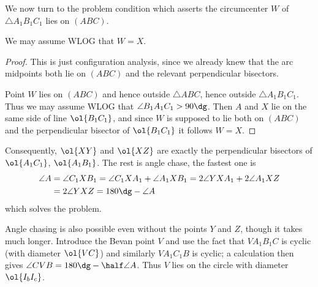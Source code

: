 We now turn to the problem condition
which asserts the circumcenter $W$ of $\triangle A_1B_1C_1$
lies on $(ABC)$.
\begin{claim*}
  We may assume WLOG that $W = X$.
\end{claim*}
\begin{proof}
  This is just configuration analysis,
  since we already knew that the arc midpoints
  both lie on $(ABC)$ and the relevant perpendicular bisectors.

  Point $W$ lies on $(ABC)$ and hence outside $\triangle ABC$,
  hence outside $\triangle A_1 B_1 C_1$.
  Thus we may assume WLOG that $\angle B_1 A_1 C_1 > 90\dg$.
  Then $A$ and $X$ lie on the same side of line $\ol{B_1 C_1}$,
  and since $W$ is supposed to lie both on $(ABC)$
  and the perpendicular bisector of $\ol{B_1C_1}$ it follows $W = X$.
\end{proof}

Consequently, $\ol{XY}$ and $\ol{XZ}$
are exactly the perpendicular bisectors
of $\ol{A_1 C_1}$, $\ol{A_1 B_1}$.
The rest is angle chase, the fastest one is
\begin{align*}
  \angle A &= \angle C_1 X B_1
  = \angle C_1 X A_1 + \angle A_1 X B_1
  = 2 \angle YXA_1 + 2 \angle A_1 X Z \\
  &= 2 \angle YXZ =  180\dg - \angle A
\end{align*}
which solves the problem.

\begin{remark*}
  Angle chasing is also possible even without
  the points $Y$ and $Z$, though it takes much longer.
  Introduce the Bevan point $V$ and use the fact
  that $VA_1B_1C$ is cyclic (with diameter $\ol{VC}$)
  and similarly $VA_1C_1B$ is cyclic;
  a calculation then gives $\angle CVB = 180\dg - \half \angle A$.
  Thus $V$ lies on the circle with diameter $\ol{I_b I_c}$.
\end{remark*}
